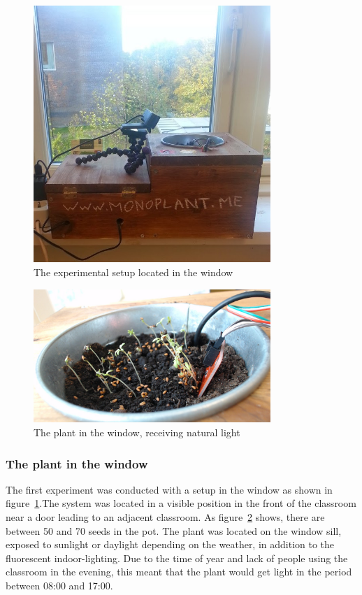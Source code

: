 \begin{figure}
\centering
\includegraphics[width=0.8\textwidth]{img/empiricalsetting/window.jpg}
\caption{The experimental setup located in the window}
\label{fig:windowplant}
\end{figure}

\begin{figure}
\centering
\includegraphics[width=0.8\textwidth]{img/empiricalsetting/windowsystem.jpg}
\caption{The plant in the window, receiving natural light}
\label{fig:windowsystemplant}
\end{figure}

\subsubsection*{The plant in the window}
The first experiment was conducted with a setup in the window as shown in figure~\ref{fig:windowplant}.The system was located in a visible position in the front of the classroom near a door leading to an adjacent classroom. As figure~\ref{fig:windowsystemplant} shows, there are between 50 and 70 seeds in the pot. The plant was located on the window sill, exposed to sunlight or daylight depending on the weather, in addition to the fluorescent indoor-lighting. Due to the time of year and lack of people using the classroom in the evening, this meant that the plant would get light in the period between 08:00 and 17:00.


